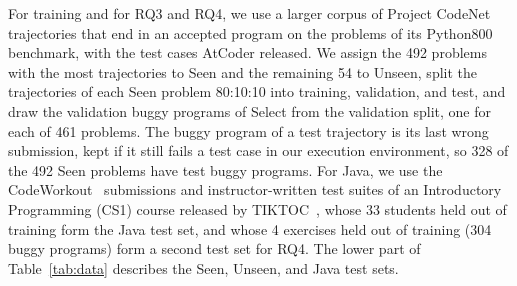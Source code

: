 \documentclass[conference]{IEEEtran}
\begin{document}
For training and for RQ3 and RQ4, we use a larger corpus of Project CodeNet trajectories that end in an accepted program on the problems of its Python800 benchmark, with the test cases AtCoder released. We assign the 492 problems with the most trajectories to Seen and the remaining 54 to Unseen, split the trajectories of each Seen problem 80:10:10 into training, validation, and test, and draw the validation buggy programs of Select from the validation split, one for each of 461 problems. The buggy program of a test trajectory is its last wrong submission, kept if it still fails a test case in our execution environment, so 328 of the 492 Seen problems have test buggy programs. For Java, we use the CodeWorkout~\cite{edwards2017codeworkout} submissions and instructor-written test suites of an Introductory Programming (CS1) course released by TIKTOC~\cite{duan2025test}, whose 33 students held out of training form the Java test set, and whose 4 exercises held out of training (304 buggy programs) form a second test set for RQ4. The lower part of Table~\ref{tab:data} describes the Seen, Unseen, and Java test sets.
\end{document}
